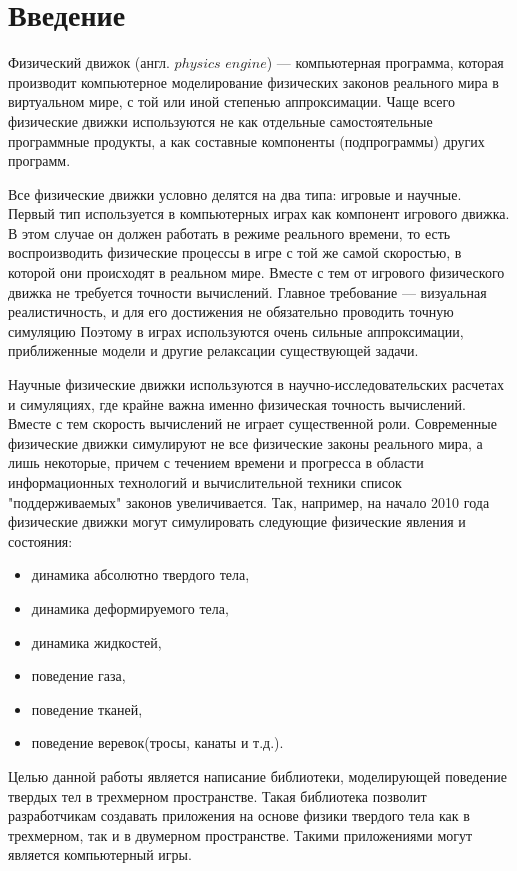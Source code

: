 \chapter*{Введение}	%
Физический движок (англ. $physics$ $engine$) --- компьютерная программа, которая производит
компьютерное моделирование физических законов реального мира в виртуальном мире,
с той или иной степенью аппроксимации. Чаще всего физические движки используются не как отдельные 
самостоятельные программные продукты, а как составные компоненты (подпрограммы) других программ.

Все физические движки условно делятся на два типа: игровые и научные.
Первый тип используется в компьютерных играх как компонент игрового движка. В этом случае он должен
работать в режиме реального времени, то есть воспроизводить физические процессы в игре с той же самой скоростью,
в которой они происходят в реальном мире. Вместе с тем от игрового физического движка не требуется точности вычислений.
Главное требование — визуальная реалистичность, и для его достижения не обязательно проводить точную симуляцию
Поэтому в играх используются очень сильные аппроксимации, приближенные модели и другие релаксации существующей задачи.

Научные физические движки используются в научно-исследовательских расчетах и симуляциях, где крайне важна
именно физическая точность вычислений. Вместе с тем скорость вычислений не играет существенной роли.
Современные физические движки симулируют не все физические законы реального мира, а лишь некоторые,
причем с течением времени и прогресса в области информационных технологий и вычислительной техники
список "поддерживаемых" законов увеличивается. Так, например, на начало 2010 года физические движки 
могут симулировать следующие физические явления и состояния:
\begin{itemize}
  \item динамика абсолютно твердого тела,
  \item динамика деформируемого тела,
  \item динамика жидкостей,
  \item поведение газа, 
  \item поведение тканей,
  \item поведение веревок(тросы, канаты и т.д.).
\end{itemize}

Целью данной работы является написание библиотеки, моделирующей поведение твердых тел в трехмерном пространстве. 
Такая библиотека позволит разработчикам создавать приложения на основе физики твердого тела как в трехмерном, так и 
в двумерном пространстве. Такими приложениями могут является компьютерный игры.

